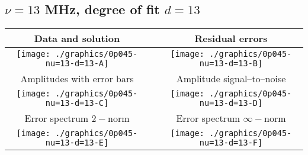 

% 

\clearpage{}
\break{}

\subsection{$\nu = 13$ MHz, degree of fit $d = 13$}

\begin{table}[h]
    \begin{center}
        \begin{tabular}{ccc}
            Data and solution & \quad & Residual errors \\\hline
            \texttt{[image: ./graphics/0p045-nu=13-d=13-A]} &&
            \texttt{[image: ./graphics/0p045-nu=13-d=13-B]} \\[15pt]
            Amplitudes with error bars && Amplitude signal--to--noise \\\hline
            \texttt{[image: ./graphics/0p045-nu=13-d=13-C]} &&
            \texttt{[image: ./graphics/0p045-nu=13-d=13-D]} \\[15pt]
            Error spectrum $2-$norm && Error spectrum $\infty-$norm \\\hline
            \texttt{[image: ./graphics/0p045-nu=13-d=13-E]} &&
            \texttt{[image: ./graphics/0p045-nu=13-d=13-F]} \\[15pt]
        \end{tabular}
    \end{center}
\label{fig:elev=45, nu=13}
\end{table}



\endinput
